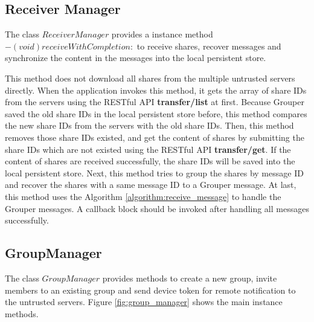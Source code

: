\documentclass[a4paper,11pt]{report}
\begin{document}
\subsection{Receiver Manager}

The class $ReceiverManager$ provides a instance method $- (void)receiveWithCompletion:$ to receive shares, recover messages and synchronize the content in the messages into the local persistent store.

This method does not download all shares from the multiple untrusted servers directly.
When the application invokes this method, it gets the array of share IDs from the servers using the RESTful API \textbf{transfer/list} at first.
Because Grouper saved the old share IDs in the local persistent store before, this method compares the new  share IDs from the servers with the old share IDs.
Then, this method removes those share IDs existed, and get the content of shares by submitting the share IDs which are not existed using the RESTful API \textbf{transfer/get}.
If the content of shares are received successfully, the share IDs will be saved into the local persistent store.
Next, this method tries to group the shares by message ID and recover the shares with a same message ID to a Grouper message.
At last, this method uses the Algorithm \ref{algorithm:receive_message} to handle the Grouper messages.
A callback block should be invoked after handling all messages successfully.

\subsection{GroupManager}

The class $GroupManager$ provides methods to create a new group, invite members to an existing group and send device token for remote notification to the untrusted servers.
Figure \ref{fig:group_manager} shows the main instance methods.
\end{document}
